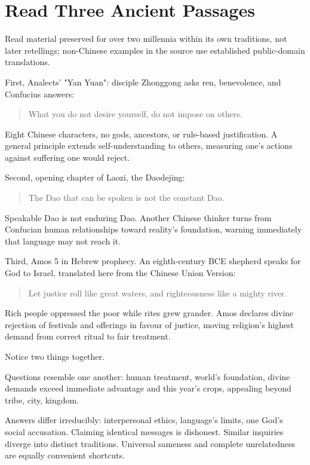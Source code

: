 \section{Read Three Ancient Passages}
Read material preserved for over two millennia within its own traditions, not later retellings; non-Chinese examples in the source use established public-domain translations.

First, Analects' "Yan Yuan": disciple Zhonggong asks ren, benevolence, and Confucius answers:

\begin{quote}
What you do not desire yourself, do not impose on others.
\end{quote}
Eight Chinese characters, no gods, ancestors, or rule-based justification. A general principle extends self-understanding to others, measuring one's actions against suffering one would reject.

Second, opening chapter of Laozi, the Daodejing:

\begin{quote}
The Dao that can be spoken is not the constant Dao.
\end{quote}
Speakable Dao is not enduring Dao. Another Chinese thinker turns from Confucian human relationships toward reality's foundation, warning immediately that language may not reach it.

Third, Amos 5 in Hebrew prophecy. An eighth-century BCE shepherd speaks for God to Israel, translated here from the Chinese Union Version:

\begin{quote}
Let justice roll like great waters, and righteousness like a mighty river.
\end{quote}
Rich people oppressed the poor while rites grew grander. Amos declares divine rejection of festivals and offerings in favour of justice, moving religion's highest demand from correct ritual to fair treatment.

Notice two things together.

Questions resemble one another: human treatment, world's foundation, divine demands exceed immediate advantage and this year's crops, appealing beyond tribe, city, kingdom.

Answers differ irreducibly: interpersonal ethics, language's limits, one God's social accusation. Claiming identical messages is dishonest. Similar inquiries diverge into distinct traditions. Universal sameness and complete unrelatedness are equally convenient shortcuts.


